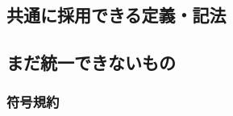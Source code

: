 \subsection{共通に採用できる定義・記法}\label{ss:conv-shared}


\subsection{まだ統一できないもの}\label{ss:conv-unresolved}


\subsubsection*{符号規約}

